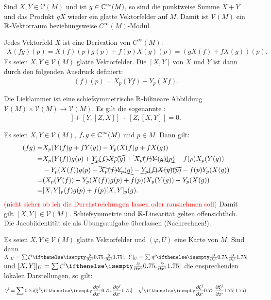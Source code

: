 \begin{bem}
  Sind $X,Y \in \mathcal V(M)$ und ist $g \in \operatorname{\mathbb{C}}^{\infty}(M)$, so sind die punktweise Summe $X+Y$ und das Produkt $gX$ wieder ein glatte Vektorfelder auf $M$. Damit ist $\mathcal V(M)$ ein $\operatorname{\mathbb{R}}$-Vektorraum beziehungsweise $C^{\infty}(M)$-Modul.
  
  Jedes Vektorfeld $X$ ist eine Derivation von $C^{\infty}(M)$:
  \begin{align*}
    X(fg)(p) = X(f)(p)g(p) + f(p) X(g)(p) = \left(gX(f) + fX(g)\right)(p).
  \end{align*}
  Es seien $X,Y \in \mathcal V(M)$ glatte Vektorfelder. Die  $[X,Y]$ von $X$ und $Y$ ist dann durch den folgenden Ausdruck definiert:
  \begin{align*}
    [X,Y](f)(p) = X_p(Yf)-Y_p(Xf).
  \end{align*}
\end{bem}

\begin{Lemma}
  Die Lieklammer ist eine schiefsymmetrische $\operatorname{\mathbb{R}}$-bilineare Abbildung $\mathcal V(M) \times \mathcal V(M) \to \mathcal V(M)$. Es gilt die sogenannte :
  \begin{align*}
    [X,[Y,Z]] + [Y,[Z,X]] + [Z,[X,Y]] = 0.
  \end{align*}
\end{Lemma}

\begin{bew}
  Es seien $X,Y \in \mathcal V(M)$, $f,g \in \operatorname{\mathbb{C}}^{\infty}(M)$ und $p \in M$. Dann gilt:
  \begin{align*}
    [X,Y](fg)  = & X_p(Y(f)g + fY(g)) - Y_p(X(f)g+fX(g))\\
    = & X_p(Y(f))g(p) + \cancel{Y_p(f)X_p(g)} + \bcancel{X_p(f)Y(g)(p)} + f(p)X_p(Y(g))\\
    & - Y_p(X(f))g(p) - \bcancel{X_p(f)Y_p(g)} - \cancel{Y_p(f)X(g)(p)} - f(p)Y_p(X(g))\\
    = & (X_p(Y(f))-Y_p(X(f))g(p) + f(p)(X_p(Y(g))-Y_p(X(g))\\
    = & [X,Y]_p (f)g(p) + f(p)[X,Y]_p(g).
  \end{align*}
  \textcolor{red}{(nicht sicher ob ich die Durchstreichungen lassen oder rausnehmen soll)}
  Damit gilt $[X,Y] \in \mathcal V(M)$. Schiefsymmetrie und $\operatorname{\mathbb{R}}$-Linearität gelten offensichtlich. Die Jacobiidentität sie als Übungsaufgabe überlassen (Nachrechnen!).
\end{bew}


\begin{Lemma}
  Es seien $X,Y \in \mathcal V(M)$ glatte Vektorfelder und $(\varphi,U)$ eine Karte von $M$.
  Sind dann $X|_U = \sum \xi^i\pdifffrac{}{x^i}, \ Y|_U = \sum \eta^i \pdifffrac{}{x^i}$ und $[X,Y]|_U = \sum \zeta^i \pdifffrac{}{x^i}$ die ensprechenden lokalen Darstellungen, so gilt:
  \begin{align*}
    \zeta^j = \sum \left(\xi^i\pdifffrac{\eta^j}{x^i} - \eta^i \pdifffrac{\xi^j}{x^i} \right).
  \end{align*}
\end{Lemma} 

